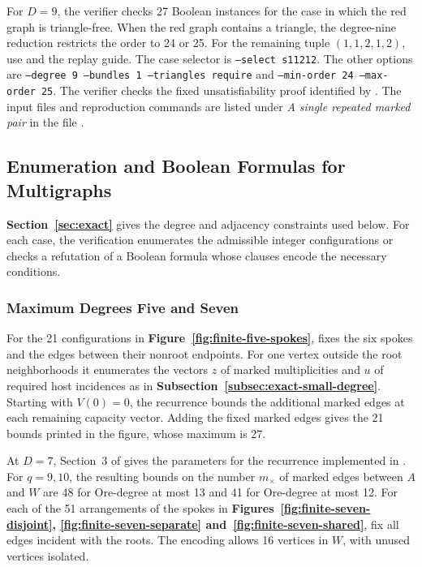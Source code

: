 \documentclass[preprint,11pt,numbers]{elsarticle-arxiv}
\numberwithin{equation}{section}
\theoremstyle{definition}
\begin{document}
For $D=9$, the verifier  checks 27 Boolean
instances for the case in which the red graph is triangle-free.
When the red graph contains a triangle, the degree-nine reduction
restricts the order to 24 or 25. For the remaining tuple
$(1,1,2,1,2)$, use  and the replay guide.
The case selector is \texttt{--select s11212}. The other options
are \texttt{--degree 9 --bundles 1 --triangles require} and
\texttt{--min-order 24 --max-order 25}.
The verifier checks the fixed unsatisfiability proof identified by
. The input files and reproduction
commands are listed under \emph{A single repeated marked pair} in the
file .
\relax\space%
\subsection{Enumeration and Boolean Formulas for Multigraphs}
\label{app:multi-finite}
\textbf{Section~\ref{sec:exact}} gives the degree and adjacency constraints used below.
For each case, the verification enumerates the admissible integer
configurations or checks a refutation of a Boolean formula whose
clauses encode the necessary conditions.

\subsubsection{Maximum Degrees Five and Seven}\label{app:multi-low-degree}

For the 21 configurations in \textbf{Figure~\ref{fig:finite-five-spokes}},
 fixes the six spokes and the edges
between their nonroot endpoints. For one vertex outside the root
neighborhoods it enumerates the vectors $z$ of marked multiplicities
and $u$ of required host incidences as in
\textbf{Subsection~\ref{subsec:exact-small-degree}}. Starting with
$V(0)=0$, the recurrence bounds the additional marked edges at each
remaining capacity vector. Adding the fixed marked edges gives the
21 bounds printed in the figure, whose maximum is 27.

At $D=7$, Section~3 of  gives the
parameters for the recurrence implemented in
. For $q=9,10$, the resulting bounds
on the number $m_\times$ of marked edges between $A$ and $W$ are 48
for Ore-degree at most 13 and 41 for Ore-degree at most 12. For each
of the 51 arrangements of the spokes in
\textbf{Figures~\ref{fig:finite-seven-disjoint},
\ref{fig:finite-seven-separate} and~\ref{fig:finite-seven-shared}},
fix all edges incident with the roots. The encoding allows 16 vertices
in $W$, with unused vertices isolated.
\end{document}
